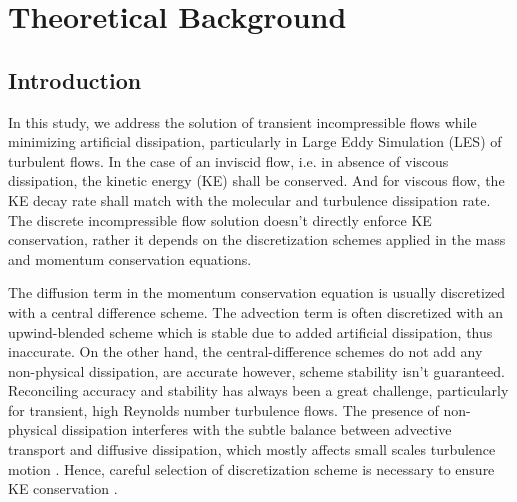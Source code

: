 
\chapter{Theoretical Background}


\section{Introduction}
\label{sec:intro}
In this study, we address the solution of transient incompressible flows while minimizing artificial dissipation, particularly in Large Eddy Simulation (LES) of turbulent flows. In the case of an inviscid flow, i.e. in absence of viscous dissipation, the kinetic energy (KE) shall be conserved. And for viscous flow, the KE decay rate shall match with the molecular and turbulence dissipation rate. The discrete incompressible flow solution doesn't directly enforce KE conservation, rather it depends on the discretization schemes applied in the mass and momentum conservation equations.

The diffusion term in the momentum conservation equation is usually discretized with a central difference scheme. The advection term is often discretized with an upwind-blended scheme which is stable due to added artificial dissipation, thus inaccurate. On the other hand, the central-difference schemes do not add any non-physical dissipation, are accurate however, scheme stability isn't guaranteed. Reconciling accuracy and stability has always been a great challenge, particularly for transient, high Reynolds number turbulence flows. The presence of non-physical dissipation interferes with the subtle balance between advective transport and diffusive dissipation, which mostly affects small scales turbulence motion \cite{verstappen2003}. Hence, careful selection of discretization scheme is necessary to ensure KE conservation \cite{perot2000, mahesh2003,sanderse2013}.

